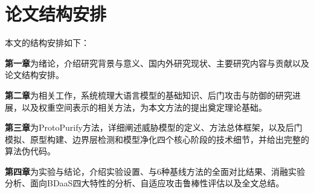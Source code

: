 \section{论文结构安排}

本文的结构安排如下：

\textbf{第一章}为绪论，介绍研究背景与意义、国内外研究现状、主要研究内容与贡献以及论文结构安排。

\textbf{第二章}为相关工作，系统梳理大语言模型的基础知识、后门攻击与防御的研究进展，以及权重空间表示的相关方法，为本文方法的提出奠定理论基础。

\textbf{第三章}为ProtoPurify方法，详细阐述威胁模型的定义、方法总体框架，以及后门模拟、原型构建、边界层检测和模型净化四个核心阶段的技术细节，并给出完整的算法伪代码。

\textbf{第四章}为实验与结论，介绍实验设置、与6种基线方法的全面对比结果、消融实验分析、面向BDaaS四大特性的分析、自适应攻击鲁棒性评估以及全文总结。
